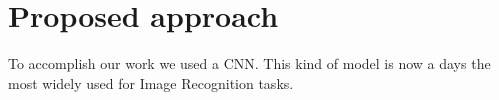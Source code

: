 \section{Proposed approach}
%

To accomplish our work we used a CNN. This kind of model is now a days the most widely used for Image Recognition tasks. 

